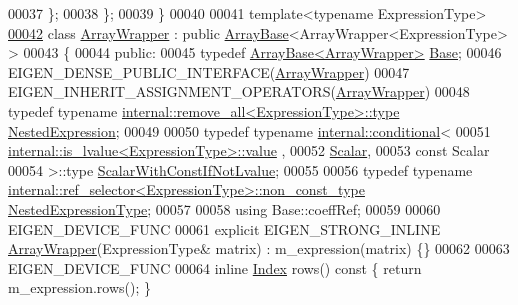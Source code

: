 \begin{DoxyCode}
00037   \};
00038 \};
00039 \}
00040 
00041 \textcolor{keyword}{template}<\textcolor{keyword}{typename} ExpressionType>
\hyperlink{group___core___module}{00042} \textcolor{keyword}{class }\hyperlink{group___core___module_class_eigen_1_1_array_wrapper}{ArrayWrapper} : \textcolor{keyword}{public} \hyperlink{group___core___module_class_eigen_1_1_array_base}{ArrayBase}<ArrayWrapper<ExpressionType> >
00043 \{
00044   \textcolor{keyword}{public}:
00045     \textcolor{keyword}{typedef} \hyperlink{group___core___module_class_eigen_1_1_array_base}{ArrayBase<ArrayWrapper>} \hyperlink{group___core___module_class_eigen_1_1_array_base}{Base};
00046     EIGEN\_DENSE\_PUBLIC\_INTERFACE(\hyperlink{group___core___module_class_eigen_1_1_array_wrapper}{ArrayWrapper})
00047     EIGEN\_INHERIT\_ASSIGNMENT\_OPERATORS(\hyperlink{group___core___module_class_eigen_1_1_array_wrapper}{ArrayWrapper})
00048     \textcolor{keyword}{typedef} \textcolor{keyword}{typename} \hyperlink{group___sparse_core___module}{internal::remove\_all<ExpressionType>::type} 
      \hyperlink{group___sparse_core___module}{NestedExpression};
00049 
00050     \textcolor{keyword}{typedef} \textcolor{keyword}{typename} \hyperlink{struct_eigen_1_1internal_1_1conditional}{internal::conditional}<
00051                        \hyperlink{struct_eigen_1_1internal_1_1is__lvalue}{internal::is\_lvalue<ExpressionType>::value}
      ,
00052                        \hyperlink{group___core___module_a5feed465b3a8e60c47e73ecce83e39a2}{Scalar},
00053                        \textcolor{keyword}{const} Scalar
00054                      >::type \hyperlink{class_eigen_1_1internal_1_1_tensor_lazy_evaluator_writable}{ScalarWithConstIfNotLvalue};
00055 
00056     \textcolor{keyword}{typedef} \textcolor{keyword}{typename} \hyperlink{class_eigen_1_1internal_1_1_tensor_lazy_evaluator_writable}{internal::ref\_selector<ExpressionType>::non\_const\_type}
       \hyperlink{class_eigen_1_1internal_1_1_tensor_lazy_evaluator_writable}{NestedExpressionType};
00057 
00058     \textcolor{keyword}{using} Base::coeffRef;
00059 
00060     EIGEN\_DEVICE\_FUNC
00061     \textcolor{keyword}{explicit} EIGEN\_STRONG\_INLINE \hyperlink{group___core___module_class_eigen_1_1_array_wrapper}{ArrayWrapper}(ExpressionType& matrix) : m\_expression(matrix) \{\}
00062 
00063     EIGEN\_DEVICE\_FUNC
00064     \textcolor{keyword}{inline} \hyperlink{namespace_eigen_a62e77e0933482dafde8fe197d9a2cfde}{Index} rows()\textcolor{keyword}{ const }\{ \textcolor{keywordflow}{return} m\_expression.rows(); \}

\end{DoxyCode}
